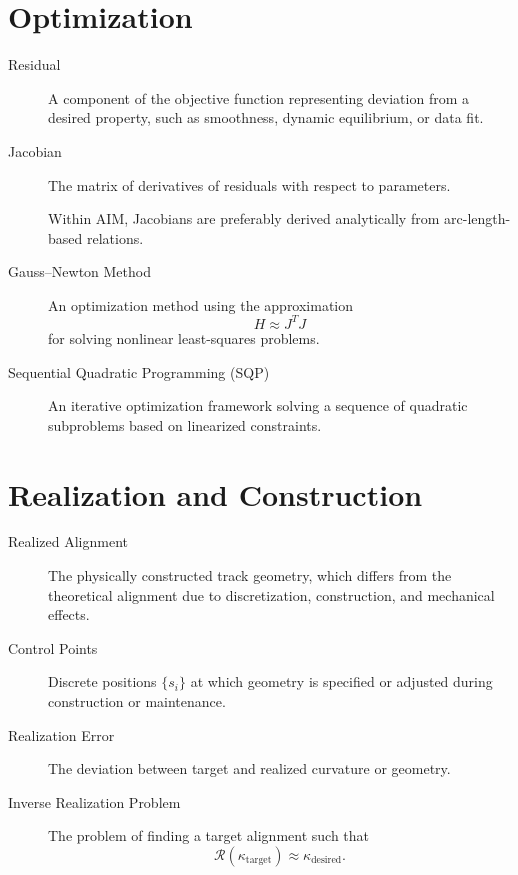 \section*{Optimization}

\begin{description}

\item[Residual]
A component of the objective function representing deviation from a
desired property, such as smoothness, dynamic equilibrium, or data fit.

\item[Jacobian]
The matrix of derivatives of residuals with respect to parameters.

Within AIM, Jacobians are preferably derived analytically from
arc-length-based relations.

\item[Gauss--Newton Method]
An optimization method using the approximation
\[
H \approx J^T J
\]
for solving nonlinear least-squares problems.

\item[Sequential Quadratic Programming (SQP)]
An iterative optimization framework solving a sequence of quadratic
subproblems based on linearized constraints.

\end{description}

\section*{Realization and Construction}

\begin{description}

\item[Realized Alignment]
The physically constructed track geometry, which differs from the
theoretical alignment due to discretization, construction, and
mechanical effects.

\item[Control Points]
Discrete positions \(\{s_i\}\) at which geometry is specified or
adjusted during construction or maintenance.

\item[Realization Error]
The deviation between target and realized curvature or geometry.

\item[Inverse Realization Problem]
The problem of finding a target alignment such that
\[
\mathcal{R}(\kappa_{\mathrm{target}})
\approx
\kappa_{\mathrm{desired}}.
\]

\end{description}

